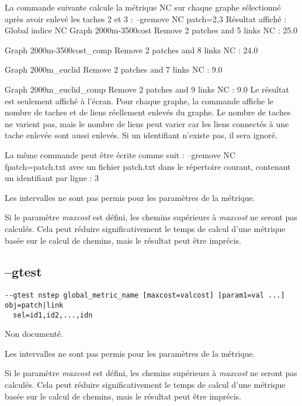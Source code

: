 \documentclass[a4paper,10pt]{report}
\newenvironment{cmd}
{\quote\Verbatim}
{\endVerbatim\endquote}
\begin{document}
La commande suivante calcule la métrique NC sur chaque graphe sélectionné après avoir enlevé les taches 2 et 3 :
\begin{cmd}
--gremove NC patch=2,3
\end{cmd}
Résultat affiché : 
\begin{cmd}
Global indice NC
Graph 2000m-3500cost
Remove 2 patches and 5 links
NC : 25.0

Graph 2000m-3500cost_comp
Remove 2 patches and 8 links
NC : 24.0

Graph 2000m_euclid
Remove 2 patches and 7 links
NC : 9.0

Graph 2000m_euclid_comp
Remove 2 patches and 9 links
NC : 9.0
\end{cmd}
Le résultat est seulement affiché à l'écran.
Pour chaque graphe, la commande affiche le nombre de taches et de liens réellement enlevés du graphe.
Le nombre de taches ne varient pas, mais le nombre de liens peut varier car les liens connectés à une tache enlevée sont aussi enlevés.
Si un identifiant n'existe pas, il sera ignoré.

La même commande peut être écrite comme suit :
\begin{cmd}
--gremove NC fpatch=patch.txt
\end{cmd}
avec un fichier patch.txt dans le répertoire courant, contenant un identifiant par ligne :
\begin{cmd}
2
3
\end{cmd}

Les intervalles ne sont pas permis pour les paramètres de la métrique.

Si le paramètre \textit{maxcost} est défini, les chemins supérieurs à \textit{maxcost} ne seront pas calculés. 
Cela peut réduire significativement le temps de calcul d'une métrique basée sur le calcul de chemins, mais le résultat peut être imprécis.

\subsection{--gtest}
\begin{verbatim}
--gtest nstep global_metric_name [maxcost=valcost] [param1=val ...] obj=patch|link 
  sel=id1,id2,...,idn
\end{verbatim}

Non documenté.

Les intervalles ne sont pas permis pour les paramètres de la métrique.

Si le paramètre \textit{maxcost} est défini, les chemins supérieurs à \textit{maxcost} ne seront pas calculés. 
Cela peut réduire significativement le temps de calcul d'une métrique basée sur le calcul de chemins, mais le résultat peut être imprécis.
\end{document}
